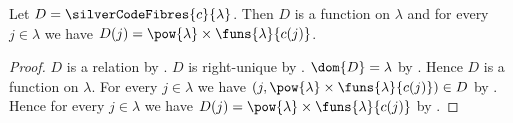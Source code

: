 \begin{proposition}\label{silver_code_fibres_type}
    Let $D=\silverCodeFibres{c}{\lambda}$.
    Then $D$ is a function on $\lambda$ and
        for every $j\in\lambda$ we have
            $D(j)=\pow{\lambda}\times\funs{\lambda}{c(j)}$.
\end{proposition}
\begin{proof}
    $D$ is a relation by .
    $D$ is right-unique
        by .
    $\dom{D}=\lambda$
        by .
    Hence $D$ is a function on $\lambda$.
    For every $j\in\lambda$ we have
        $(j,\pow{\lambda}\times\funs{\lambda}{c(j)})\in D$
        by .
    Hence for every $j\in\lambda$ we have
        $D(j)=\pow{\lambda}\times\funs{\lambda}{c(j)}$
        by .
\end{proof}

